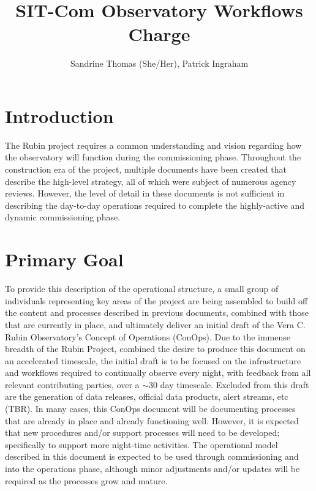 \documentclass[SE,authoryear,toc]{lsstdoc}
\title{SIT-Com Observatory Workflows Charge}
\author{%
Sandrine Thomas (She/Her),
Patrick Ingraham
}
\date{\vcsDate}
\begin{document}
\maketitle



\section{Introduction}
The Rubin project requires a common understanding and vision regarding how the observatory will function during the commissioning phase. 
Throughout the construction era of the project, multiple documents have been created that describe the high-level strategy, all of which were subject of numerous agency reviews. 
However, the level of detail in these documents is not sufficient in describing the day-to-day operations required to complete the highly-active and dynamic commissioning phase. 

\section{Primary Goal}
To provide this description of the operational structure, a small group of individuals representing key areas of the project are being assembled to build off the content and processes described in previous documents, combined with those that are currently in place, and ultimately deliver an initial draft of the Vera C. Rubin Observatory's Concept of Operations (ConOps).
Due to the immense breadth of the Rubin Project, combined the desire to produce this document on an accelerated timescale, the initial draft is to be focused on the infrastructure and workflows required to continually observe every night, with feedback from all relevant contributing parties, over a $\sim$30 day timescale. 
Excluded from this draft are the generation of data releases, official data products, alert streams, etc (TBR). 
In many cases, this ConOps document will be documenting processes that are already in place and already functioning well. 
However, it is expected that new procedures and/or support processes will need to be developed; specifically to support more night-time activities.
The operational model described in this document is expected to be used through commissioning and into the operations phase, although minor adjustments and/or updates will be required as the processes grow and mature.
\end{document}
